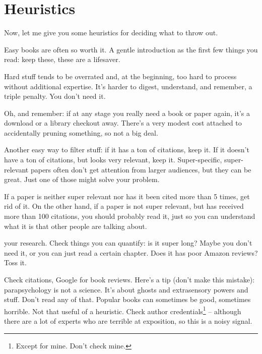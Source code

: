 \section{Heuristics}

Now, let me give you some heuristics for deciding what to throw out.

Easy books are often so worth it. A gentle introduction as the first few things
you read: keep these, these are a lifesaver.

Hard stuff tends to be overrated and, at the beginning, too hard to process
without additional expertise. It's harder to digest, understand, and
remember, a triple penalty. You don't need it.

Oh, and remember: if at any stage you really need a book or paper again, it's a
download or a library checkout away. There's a very modest cost attached to
accidentally pruning something, so not a big deal.

Another easy way to filter stuff: if it has a ton of citations, keep it. If it
doesn't have a ton of citations, but looks very relevant, keep
it. Super-specific, super-relevant papers often don't get attention from
larger audiences, but they can be great. Just one of those might solve
your problem.

If a paper is neither super relevant nor has it been cited more than 5 times, get rid
of it. On the other hand, if a paper is not super relevant, but has received
more than 100 citations, you should probably read it, just so you can understand
what it is that other people are talking about. 

 your research. Check things you can quantify: is it
super long? Maybe you don't need it, or you can just read a certain
chapter. Does it has poor Amazon reviews? Toss it.

Check citations, Google for book reviews. Here's a tip (don't make this mistake):
parapsychology is not a science. It's about ghosts and extrasensory powers
and
stuff. Don't read any of that.
Popular books can sometimes be good, sometimes horrible. Not that useful of a heuristic. Check author credentials\footnote{Except for mine. Don't check mine.} -- although there are a lot of experts who
are terrible at exposition, so this is a noisy signal. 

